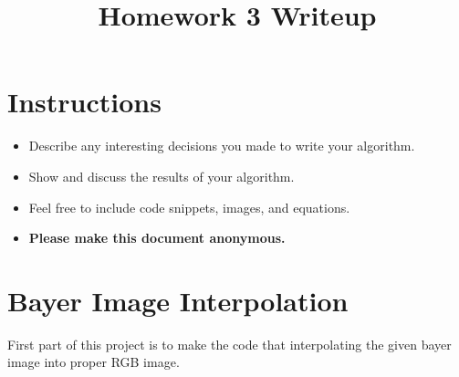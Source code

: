 \frenchspacing
\setlength{\parindent}{0cm} %
\setlength{\parskip}{0.3cm plus1mm minus1mm}

\pagestyle{fancy}
\fancyhf{}
\rfoot{\thepage}

\date{}

\title{\vspace{-1cm}Homework 3 Writeup}



\maketitle
\vspace{-3cm}
\thispagestyle{fancy}

\section*{Instructions}
\begin{itemize}
  \item Describe any interesting decisions you made to write your algorithm.
  \item Show and discuss the results of your algorithm.
  \item Feel free to include code snippets, images, and equations.
  \item \textbf{Please make this document anonymous.}
\end{itemize}

\section*{Bayer Image Interpolation}

First part of this project is to make the code that interpolating the given bayer image into proper RGB image. 

